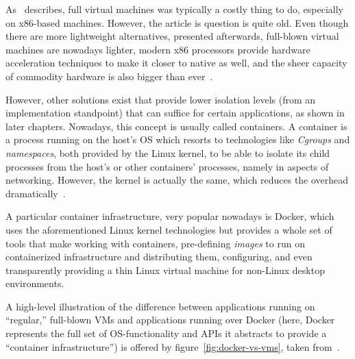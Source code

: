 As~\cite{introvirtualization} describes, full virtual machines was typically a costly thing to do, especially on x86-based machines.
However, the article is question is quite old.
Even though there are more lightweight alternatives, presented afterwards, full-blown virtual machines are nowadays lighter, modern x86 processors provide hardware acceleration techniques to make it closer to native as well, and the sheer capacity of commodity hardware is also bigger than ever~\cite{virtualizationcontainerization}.

However, other solutions exist that provide lower isolation levels (from an implementation standpoint) that can suffice for certain applications, as shown in later chapters. Nowadays, this concept is usually called containers.
A container is a process running on the host's OS which resorts to technologies like \emph{Cgroups} and \emph{namespaces}, both provided by the Linux kernel, to be able to isolate its child processes from the host's or other containers' processes, namely in aspects of networking.
However, the kernel is actually the same, which reduces the overhead dramatically~\cite{comparativevmscontainers}.

A particular container infrastructure, very popular nowadays is Docker, which uses the aforementioned Linux kernel technologies but provides a whole set of tools that make working with containers, pre-defining \emph{images} to run on containerized infrastructure and distributing them, configuring, and even transparently providing a thin Linux virtual machine for non-Linux desktop environments.

A high-level illustration of the difference between applications running on ``regular,'' full-blown VMs and applications running over Docker (here, Docker represents the full set of OS-functionality and APIs it abstracts to provide a ``container infrastructure'') is offered by figure~\ref{fig:docker-vs-vms}, taken from~\cite{dockercontreplacingvms}.




